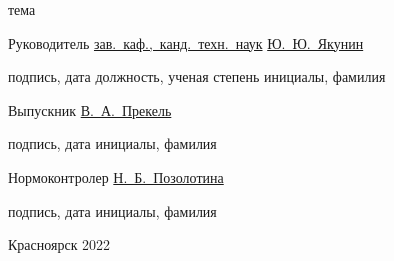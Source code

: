 \begin{spacing}{1}
\begin{centering}
    \end{centering}

    \vspace{-4pt}
    \centerline{\footnotesize тема}

    \vfill
    \vfill
    \vfill

    Руководитель
    \hfill
    \uline{\hspace{10ex}}
    \hspace{3.5ex}
    \uline{зав.~каф.,~канд.~техн.~наук}
    \hspace{2ex}
    \uline{Ю.~Ю.~Якунин}
    \par
    \vspace{-4pt}
    \par
    \hfill
    {\footnotesize подпись, дата}
    \hspace{7.3ex}
    {\footnotesize должность, ученая степень}
    \hspace{6ex}
    {\footnotesize инициалы, фамилия}

    Выпускник
    \hfill
    \uline{\hspace{10ex}}
    \hspace{32ex}
    \uline{В.~А.~Прекель}
    \par
    \vspace{-4pt}
    \par
    \hfill
    {\footnotesize подпись, дата}
    \hspace{32.3ex}
    {\footnotesize инициалы, фамилия}

    Нормоконтролер
    \hfill
    \uline{\hspace{10ex}}
    \hspace{29ex}
    \uline{Н.~Б.~Позолотина}
    \par
    \vspace{-4pt}
    \par
    \hfill
    {\footnotesize подпись, дата}
    \hspace{32.3ex}
    {\footnotesize инициалы, фамилия}

    \vfill

    \centerline{Красноярск 2022}

\end{spacing}

\thispagestyle{empty}

\clearpage

